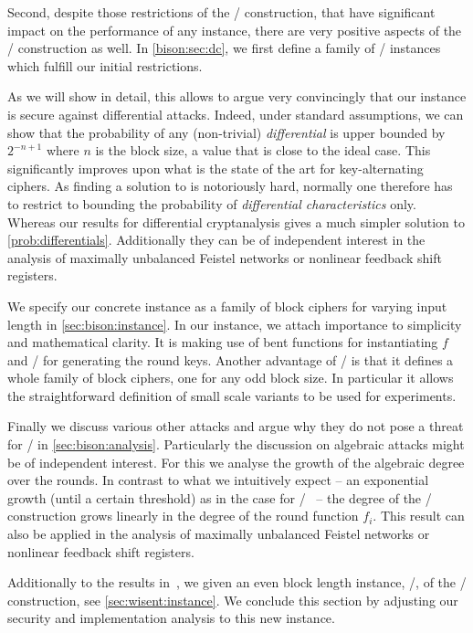 Second, despite those restrictions of the \WSN/ construction, that have significant impact on the performance of any instance, there are very positive aspects of the \WSN/ construction as well.
In \cref{bison:sec:dc}, we first define a family of \WSN/ instances which fulfill our initial restrictions.

As we will show in detail, this allows to argue very convincingly that our instance is secure against differential attacks.
Indeed, under standard assumptions, we can show that the probability of any (non-trivial) \emph{differential} is upper bounded by $2^{-n+1}$ where \(n\) is the block size, a value that is close to the ideal case.
This significantly improves upon what is the state of the art for key-alternating ciphers.
As finding a solution to  is notoriously hard, normally one therefore has to restrict to bounding the probability of \emph{differential characteristics} only.
Whereas our results for differential cryptanalysis gives a much simpler solution to \cref{prob:differentials}.
Additionally they can be of independent interest in the analysis of maximally unbalanced Feistel networks or nonlinear feedback shift registers.

We specify our concrete instance as a family of block ciphers for varying input length in \cref{sec:bison:instance}.
In our instance, we attach importance to simplicity and mathematical clarity.
It is making use of bent functions for instantiating $f$ and \LFSRp/ for generating the round keys.
Another advantage of \bison/ is that it defines a whole family of block ciphers, one for any odd block size.
In particular it allows the straightforward definition of small scale variants to be used for experiments.

Finally we discuss various other attacks and argue why they do not pose a threat for \bison/ in \cref{sec:bison:analysis}.
Particularly the discussion on algebraic attacks might be of independent interest.
For this we analyse the growth of the algebraic degree over the rounds.
In contrast to what we intuitively expect -- an exponential growth (until a certain threshold) as in the case for \SPNp/~\cite{FSE:BouCanDeC11} -- the degree of the \WSN/ construction grows linearly in the degree of the round function $f_i$.
This result can also be applied in the analysis of maximally unbalanced Feistel networks or nonlinear feedback shift registers.

Additionally to the results in~\cite{EC:CLLNW19}, we given an even block length instance, \wisent/, of the \WSN/ construction, see \cref{sec:wisent:instance}.
We conclude this section by adjusting our security and implementation analysis to this new instance.


